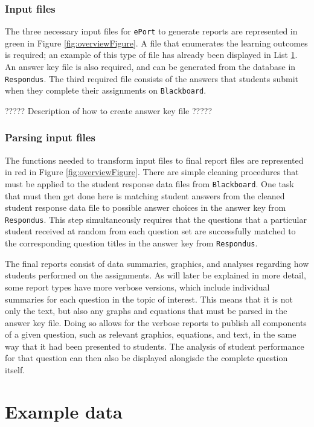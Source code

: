 \documentclass{article}\usepackage[]{graphicx}\usepackage[]{color}
\numberwithin{equation}{section} %
\begin{document}
\subsubsection{Input files}

The three necessary input files for \texttt{ePort} to generate reports are represented in green in Figure \ref{fig:overviewFigure}. A file that enumerates the learning outcomes is required; an example of this type of file has already been displayed in List \hyperref[sec:lo]{1}. An answer key file is also required, and can be generated from the database in \texttt{Respondus}. The third required file consists of the answers that students submit when they complete their assignments on \texttt{Blackboard}.

????? Description of how to create answer key file ?????

\subsubsection{Parsing input files}

The functions needed to transform input files to final report files are represented in red in Figure \ref{fig:overviewFigure}. There are simple cleaning procedures that must be applied to the student response data files from \texttt{Blackboard}. One task that must then get done here is matching student answers from the cleaned student response data file to possible answer choices in the answer key from \texttt{Respondus}. This step simultaneously requires that the questions that a particular student received at random from each question set are successfully matched to the corresponding question titles in the answer key from \texttt{Respondus}.

The final reports consist of data summaries, graphics, and analyses regarding how students performed on the assignments. As will later be explained in more detail, some report types have more verbose versions, which include individual summaries for each question in the topic of interest. This means that it is not only the text, but also any graphs and equations that must be parsed in the answer key file. Doing so allows for the verbose reports to publish all components of a given question, such as relevant graphics, equations, and text, in the same way that it had been presented to students. The analysis of student performance for that question can then also be displayed alongisde the complete question itself.

\section{Example data}
\end{document}
